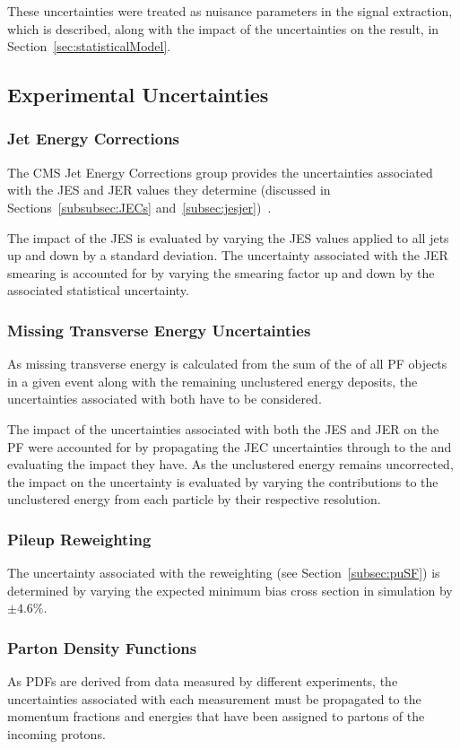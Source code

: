 These uncertainties were treated as nuisance parameters in the signal extraction, which is described, along with the impact of the uncertainties on the result, in Section~\ref{sec:statisticalModel}.

\subsection{Experimental Uncertainties}
\subsubsection*{Jet Energy Corrections}
The CMS Jet Energy Corrections group provides the uncertainties associated with the JES and JER values they determine (discussed in Sections~\ref{subsubsec:JECs} and~\ref{subsec:jesjer})~\cite{Khachatryan:2016kdb}. 

The impact of the JES is evaluated by varying the JES values applied to all jets up and down by a standard deviation.
The uncertainty associated with the JER smearing is accounted for by varying the smearing factor up and down by the associated statistical uncertainty.

\subsubsection*{Missing Transverse Energy Uncertainties}
As missing transverse energy is calculated from the sum of the \pT of all PF objects in a given event along with the remaining unclustered energy deposits, the uncertainties associated with both have to be considered.

The impact of the uncertainties associated with both the JES and JER on the PF \MET were accounted for by propagating the JEC uncertainties through to the \MET and evaluating the impact they have.
As the unclustered energy remains uncorrected, the impact on the \MET uncertainty is evaluated by varying the contributions to the unclustered energy from each particle by their respective resolution.

\subsubsection*{Pileup Reweighting}
The uncertainty associated with the \PU reweighting (see Section~\ref{subsec:puSF}) is determined by varying the expected minimum bias cross section in simulation by $\pm 4.6\%$.

\subsubsection*{Parton Density Functions}\label{subsec:pdfSysts}
As PDFs are derived from data measured by different experiments, the uncertainties associated with each measurement must be propagated to the momentum fractions and energies that have been assigned to partons of the incoming protons.

